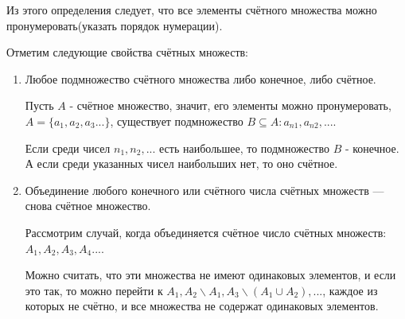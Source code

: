 \documentclass[12pt, a4paper, oneside]{article}
\theoremstyle{plain} %
\theoremstyle{definition}
\begin{document}
Из этого определения следует, что все элементы счётного множества можно пронумеровать(указать порядок нумерации).\par 
Отметим следующие свойства счётных множеств:
\begin{enumerate}
    
    \item Любое подмножество счётного множества либо конечное, либо счётное.
    
    
    Пусть $A$ - счётное множество, значит, его элементы можно пронумеровать, $A = \{a_1, a_2, a_3...\}$, существует подмножество $B \subseteq A: a_{n1}, a_{n2},...$.
    
    
    Если среди чисел $n_1, n_2, ...$ есть наибольшее, то подмножество $B$ - конечное. А если среди указанных чисел наибольших нет, то оно счётное.
    
    \item Объединение любого конечного или счётного числа счётных множеств --- снова счётное множество.
    
    
    Рассмотрим случай, когда объединяется счётное число счётных множеств:$A_1, A_2, A_3, A_4...$. 
    
    
    Можно считать, что эти множества не имеют одинаковых элементов, и если это так, то можно перейти к $A_1, A_2\backslash A_1, A_3 \backslash (A_1 \cup A_2), ...$, каждое из которых не счётно, и все множества не содержат одинаковых элементов.
    
    \begin{figure}[h!]
       
       \begin{center}
       

\end{center}
\end{figure}
\end{enumerate}
\end{document}
